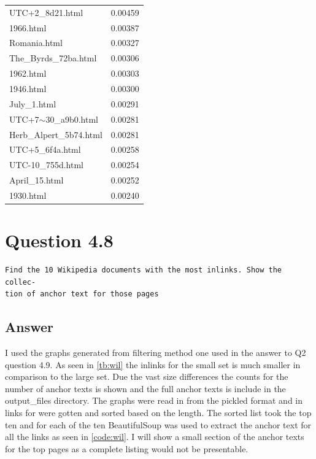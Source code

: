 \documentclass[11pt]{article}
\newenvironment{code}{\captionsetup{type=listing}}{}
\begin{document}
\begin{table}[h]
\begin{minipage}{0.5\textwidth}
\begin{tabular}{lc}
UTC+2\_8d21.html & 0.00459 \\
1966.html & 0.00387 \\
Romania.html & 0.00327 \\
The\_Byrds\_72ba.html & 0.00306 \\
1962.html & 0.00303 \\
1946.html & 0.00300 \\
July\_1.html & 0.00291 \\
UTC+7$\sim$30\_a9b0.html & 0.00281 \\
Herb\_Alpert\_5b74.html & 0.00281 \\
UTC+5\_6f4a.html & 0.00258 \\
UTC-10\_755d.html & 0.00254 \\
April\_15.html & 0.00252 \\
1930.html & 0.00240
\end{tabular}
\end{minipage}
\end{table}
\newpage
\clearpage
\begin{code}
	 \label{code:pr}
\end{code}

\newpage
\section{Question 4.8}
\begin{verbatim}
Find the 10 Wikipedia documents with the most inlinks. Show the collec-
tion of anchor text for those pages
\end{verbatim}
\subsection{Answer}
I used the graphs generated from filtering method one used in the answer to Q2 question 4.9. 
As seen in \autoref{tb:wil} the inlinks for the small set is much smaller in comparison to the large set. Due the vast size differences the counts for the number of anchor texts is shown and the full anchor texts is include in the output\_files directory. The graphs were read in from the pickled format and in links for were gotten and sorted based on the length. The sorted list took the top ten and for each of the ten BeautifulSoup was used to extract the anchor text for all the links as seen in \autoref{code:wil}. \newline \newline \noindent
I will show a small section of the anchor texts for the top pages as a complete listing would not be presentable. \newline
\end{document}
